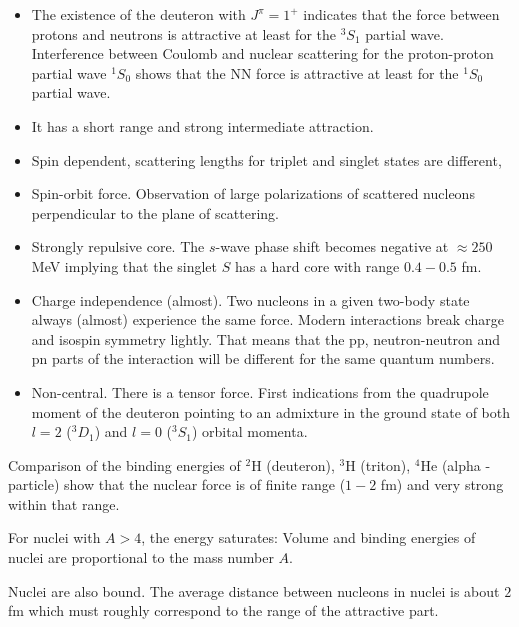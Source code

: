 \documentclass[%
oneside,                 %
final,                   %
10pt]{article}
\begin{document}
\begin{itemize}
\item The existence of the deuteron with $J^{\pi}=1^+$ indicates that the force between protons and neutrons is attractive at least for the $^3S_1$ partial wave. Interference between Coulomb and nuclear scattering for the proton-proton partial wave $^1S_0$ shows that  the NN force is attractive at least for the $^1S_0$ partial wave. 

\item It has a short range and strong intermediate attraction.

\item Spin dependent, scattering lengths for triplet and singlet states are different,

\item Spin-orbit force. Observation of large polarizations of scattered nucleons perpendicular to the plane of scattering.

\item Strongly repulsive core. The $s$-wave phase shift becomes negative at $\approx 250$ MeV implying that the singlet $S$ has a hard core with range $0.4-0.5$ fm. 

\item Charge independence (almost). Two nucleons in a given two-body state always (almost) experience the same force. Modern interactions break charge and isospin symmetry lightly. That means that the pp, neutron-neutron and pn parts of the interaction will be different for the same quantum numbers. 

\item Non-central. There is a tensor force. First indications from the quadrupole moment of the deuteron pointing to an admixture in the ground state of both $l=2$ ($^3D_1$) and $l=0$ ($^3S_1$) orbital momenta.
\end{itemize}

\noindent
Comparison of the binding energies of
${}^2\mbox{H}$ (deuteron), ${}^3\mbox{H}$ (triton), ${}^4\mbox{He}$ (alpha - particle) show that the nuclear force is of finite range ($1-2$ fm) and very strong within that range.

For nuclei with $A>4$, the energy saturates: Volume and binding energies of nuclei are proportional to the mass number $A$.

Nuclei are also bound. The average distance
between nucleons in nuclei is about $2$ fm which
must roughly correspond to the range of the
attractive part.
\end{document}
